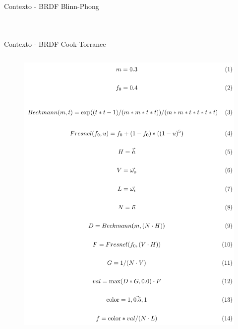 \begin{frame}{Contexto - BRDF Blinn-Phong}
\begin{columns}
\begin{figure}[H]
        \end{figure}
    \end{columns}
\end{frame}

\begin{frame}{Contexto - BRDF Cook-Torrance}
    \begin{columns}
        \small{}
        \vspace{-0.55cm}
        \begin{figure}
            \includegraphics[scale=0.48]{./Imagens/brdfs/cook-torrance-alternative.pdf}
        \end{figure}
        

\end{columns}
\end{frame}

